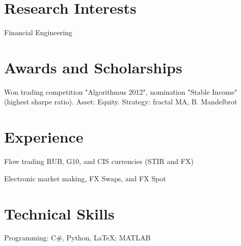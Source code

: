 \documentclass[a4paper,20pt]{article}
\begin{document}
\vspace{0pt}
\section{Research Interests}
	Financial Engineering\\

\vspace{0pt}
\section{Awards and Scholarships}
	\begin{description}[font=$\bullet$]
		\item{Won trading competition "Algorithmus 2012", nomination "Stable Income" (highest sharpe ratio). Asset: Equity. Strategy: fractal MA, B.
    Mandelbrot}
		\vspace{-5pt}		
\end{description}

% 	

\vspace{-5pt}
\section{Experience}
	\begin{description}[font=$\bullet$]
		\item{Flow trading RUB, G10, and CIS currencies (STIR and FX)}
    \item{Electronic market making, FX Swaps, and FX Spot}
		\vspace{-5pt}		
	\end{description}
	
\vspace{-5pt}
\section{Technical Skills}
	Programming: C\#, Python, \LaTeX; MATLAB\\ 
	
\end{document}
